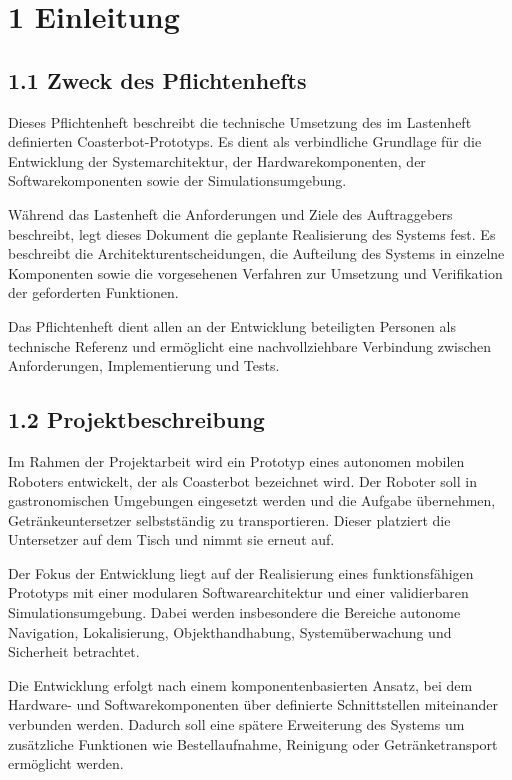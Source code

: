 \documentclass[
]{article}
\author{}
\date{}
\begin{document}
\section{1 Einleitung}\label{einleitung}

\subsection{1.1 Zweck des
Pflichtenhefts}\label{zweck-des-pflichtenhefts}

Dieses Pflichtenheft beschreibt die technische Umsetzung des im
Lastenheft definierten Coasterbot-Prototyps. Es dient als verbindliche
Grundlage für die Entwicklung der Systemarchitektur, der
Hardwarekomponenten, der Softwarekomponenten sowie der
Simulationsumgebung.

Während das Lastenheft die Anforderungen und Ziele des Auftraggebers
beschreibt, legt dieses Dokument die geplante Realisierung des Systems
fest. Es beschreibt die Architekturentscheidungen, die Aufteilung des
Systems in einzelne Komponenten sowie die vorgesehenen Verfahren zur
Umsetzung und Verifikation der geforderten Funktionen.

Das Pflichtenheft dient allen an der Entwicklung beteiligten Personen
als technische Referenz und ermöglicht eine nachvollziehbare Verbindung
zwischen Anforderungen, Implementierung und Tests.

\subsection{1.2 Projektbeschreibung}\label{projektbeschreibung}

Im Rahmen der Projektarbeit wird ein Prototyp eines autonomen mobilen
Roboters entwickelt, der als Coasterbot bezeichnet wird. Der Roboter
soll in gastronomischen Umgebungen eingesetzt werden und die Aufgabe
übernehmen, Getränkeuntersetzer selbstständig zu transportieren. Dieser
platziert die Untersetzer auf dem Tisch und nimmt sie erneut auf.

Der Fokus der Entwicklung liegt auf der Realisierung eines
funktionsfähigen Prototyps mit einer modularen Softwarearchitektur und
einer validierbaren Simulationsumgebung. Dabei werden insbesondere die
Bereiche autonome Navigation, Lokalisierung, Objekthandhabung,
Systemüberwachung und Sicherheit betrachtet.

Die Entwicklung erfolgt nach einem komponentenbasierten Ansatz, bei dem
Hardware- und Softwarekomponenten über definierte Schnittstellen
miteinander verbunden werden. Dadurch soll eine spätere Erweiterung des
Systems um zusätzliche Funktionen wie Bestellaufnahme, Reinigung oder
Getränketransport ermöglicht werden.
\end{document}
